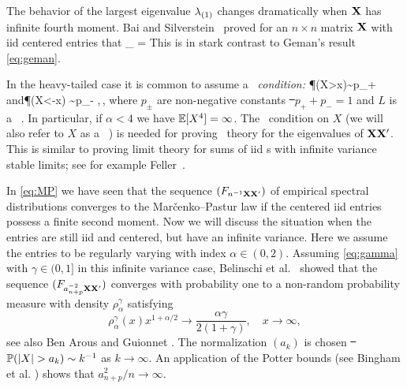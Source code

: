 The behavior of the largest eigenvalue $\lambda_{(1)}$
changes dramatically when ${\mathbf X}$ has infinite fourth moment.
Bai and Silverstein~\cite{baisilv} proved for an $n\times n$ matrix ${\mathbf X}$ with iid centered entries
that
\beam\label{eq:wdfr}
\limsup_{\nto} =\infty {}
\eeam
This is in stark contrast to Geman's result \eqref{eq:geman}.
\par
In the heavy-tailed case it is common to assume a {\em \regvar\ condition:}
\beam\label{eq:regvar}
\P(X>x)\sim p_+\,\qquad\mbox{and}\qquad \P(X<-x) \sim p_-\,\,,\qquad \xto\,,
\eeam
where $ p_\pm$ are non-negative constants \st\ $p_++p_-=1$ and $L$ is a \slvary\ \fct . In particular, if $\alpha<4$ we have $\mathbb{E} [X^4]= \infty$. The \regvar\ condition
on $X$ (we will also refer to $X$ as a \regvary\ \rv ) is needed for proving \asy\ theory for
the eigenvalues of ${\mathbf X}{\mathbf X}'$. This is similar to proving limit theory for sums
of iid \rv s with infinite variance stable limits; see for example Feller~\cite{feller}.
\par

In \eqref{eq:MP} we have seen that the sequence $(F_{n^{-1}{\mathbf X} {\mathbf X}'})$ of empirical spectral distributions converges to the Mar\v cenko--Pastur law if the centered iid entries possess a finite second moment. Now we will discuss the situation when the entries are still iid and centered, but have an infinite variance. Here we assume the entries to be regularly varying with index $\alpha \in (0,2)$.
Assuming \eqref{eq:gamma} with $\gamma\in (0,1]$ in this infinite variance case, Belinschi et al.~\cite[Theorem~1.10]{belinschi:dembo:guionnet:2009} showed that the sequence $(F_{a_{n+p}^{-2}{\mathbf X} {\mathbf X}'})$ converges with probability one to a non-random probability measure with density $\rho_{\alpha}^\gamma$ satisfying
\begin{equation*}
\rho_{\alpha}^\gamma(x) x^{1+\alpha/2} \to \frac{\alpha \gamma}{2(1+\gamma)}, \quad x \to \infty,
\end{equation*}
see also Ben Arous and Guionnet \cite[Theorem~1.6]{arous:guionnet:2008}.
The normalization $(a_k)$ is chosen \st\ $\P(|X|>a_k)\sim k^{-1}$ as $k\to\infty$. An application of the Potter bounds (see Bingham et al. \cite[p.~25]{bingham:goldie:teugels:1987}) shows that $a_{n+p}^2/n \to \infty$.



